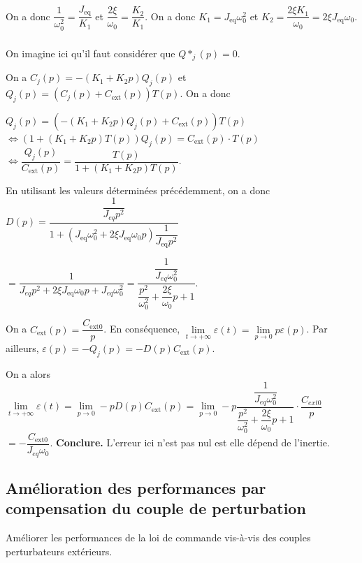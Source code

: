 \documentclass[10pt,fleqn]{article} %
\begin{document}
On a donc $\dfrac{1}{\omega_0^2}=\dfrac{J_{\text{eq}}}{K_1}$ et $\dfrac{2\xi}{\omega_0}=\dfrac{K_2}{K_1}$. On a donc $K_1=J_{\text{eq}}\omega_0^2$ et $K_2=\dfrac{2\xi K_1}{\omega_0}=2\xi J_{\text{eq}}\omega_0$.

\subparagraph{}%
On imagine ici qu'il faut considérer que $Q*_j(p)=0$.

On a $C_j(p)=-\left(K_1+K_2 p\right) Q_j(p)$ et $Q_j(p)=\left(C_j(p)+C_{\text{ext}}(p)\right)T(p)$.  On a donc  



$Q_j(p)=\left(-\left(K_1+K_2 p\right) Q_j(p)+C_{\text{ext}}(p)\right)T(p)$
$\Leftrightarrow \left(1+\left(K_1+K_2 p\right)T(p) \right)Q_j(p)=C_{\text{ext}}(p)\cdot T(p)$
$\Leftrightarrow \dfrac{Q_j(p)}{C_{\text{ext}}(p)}=\dfrac{T(p)}{1+\left(K_1+K_2 p\right)T(p) }$.

En utilisant les valeurs déterminées précédemment, on a donc $D(p)=\dfrac{\dfrac{1}{J_{eq}p^2}}{1+\left(J_{\text{eq}}\omega_0^2+2\xi J_{\text{eq}}\omega_0 p\right)\dfrac{1}{J_{\text{eq}}p^2} }$

$=\dfrac{1}{J_{eq}p^2+2\xi J_{\text{eq}}\omega_0 p+J_{eq}\omega_0^2}=\dfrac{\dfrac{1}{J_{eq}\omega_0^2}}{\dfrac{p^2}{\omega_0^2}+\dfrac{2\xi}{\omega_0}p+1}$.

On a $C_{\text{ext}}(p)=\dfrac{C_{\text{ext} 0}}{p}$. En conséquence, 
$\lim\limits_{t\to +\infty} \varepsilon(t) = \lim\limits_{p\to 0} p\varepsilon(p)$.
Par ailleurs,  $\varepsilon(p)=-Q_j(p)=-D(p)C_{\text{ext}}(p)$.

On a alors $\lim\limits_{t\to +\infty} \varepsilon(t) = \lim\limits_{p\to 0} -pD(p)C_{\text{ext}}(p)= \lim\limits_{p\to 0} -p\dfrac{\dfrac{1}{J_{eq}\omega_0^2}}{\dfrac{p^2}{\omega_0^2}+\dfrac{2\xi}{\omega_0}p+1}\cdot \dfrac{C_{ext0}}{p}$
$=  -\dfrac{C_{\text{ext} 0}}{J_{eq}\omega_0}$.
\textbf{Conclure.} L'erreur ici n'est pas nul est elle dépend de l'inertie. 


\subsection{Amélioration des performances par compensation du couple de perturbation}
\begin{obj}
Améliorer les performances de la loi de commande vis-à-vis des couples perturbateurs extérieurs.
\end{obj}
\end{document}
